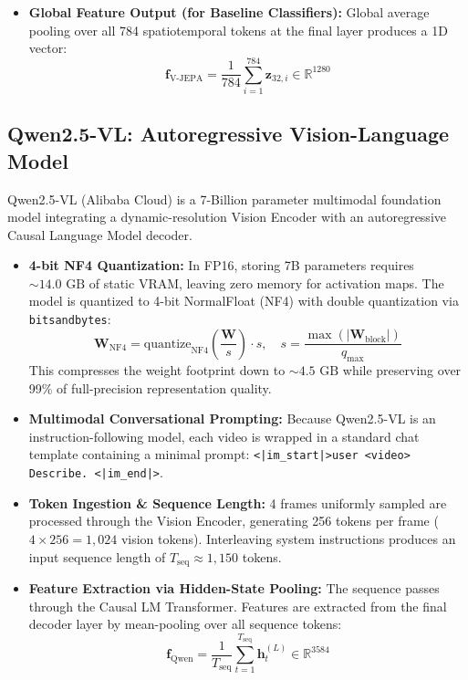 \documentclass[a4paper, 11pt]{article}
\begin{document}
\begin{itemize}
\begin{equation}
        \mathbf{F}_{\text{multi}} = [\bar{\mathbf{z}}_6;\; \bar{\mathbf{z}}_{12};\; \bar{\mathbf{z}}_{18};\; \bar{\mathbf{z}}_{24}] \in \mathbb{R}^{4 \times T' \times 1280} \quad (T'=4)
    \end{equation}
    \item \textbf{Global Feature Output (for Baseline Classifiers):} Global average pooling over all 784 spatiotemporal tokens at the final layer produces a 1D vector:
    \begin{equation}
        \mathbf{f}_{\text{V-JEPA}} = \frac{1}{784}\sum_{i=1}^{784} \mathbf{z}_{32, i} \in \mathbb{R}^{1280}
    \end{equation}
\end{itemize}

\subsection{Qwen2.5-VL: Autoregressive Vision-Language Model}
Qwen2.5-VL (Alibaba Cloud) is a 7-Billion parameter multimodal foundation model integrating a dynamic-resolution Vision Encoder with an autoregressive Causal Language Model decoder.

\begin{itemize}
    \item \textbf{4-bit NF4 Quantization:} In FP16, storing 7B parameters requires $\sim 14.0\text{ GB}$ of static VRAM, leaving zero memory for activation maps. The model is quantized to 4-bit NormalFloat (NF4) with double quantization via \texttt{bitsandbytes}:
    \begin{equation}
        \mathbf{W}_{\text{NF4}} = \text{quantize}_{\text{NF4}}\left(\frac{\mathbf{W}}{s}\right) \cdot s, \quad s = \frac{\max(|\mathbf{W}_{\text{block}}|)}{q_{\max}}
    \end{equation}
    This compresses the weight footprint down to $\sim 4.5\text{ GB}$ while preserving over 99\% of full-precision representation quality.
    \item \textbf{Multimodal Conversational Prompting:} Because Qwen2.5-VL is an instruction-following model, each video is wrapped in a standard chat template containing a minimal prompt: \texttt{<|im\_start|>user <video> Describe. <|im\_end|>}.
    \item \textbf{Token Ingestion \& Sequence Length:} 4 frames uniformly sampled are processed through the Vision Encoder, generating 256 tokens per frame ($4 \times 256 = 1,024$ vision tokens). Interleaving system instructions produces an input sequence length of $T_{\text{seq}} \approx 1,150$ tokens.
    \item \textbf{Feature Extraction via Hidden-State Pooling:} The sequence passes through the Causal LM Transformer. Features are extracted from the final decoder layer by mean-pooling over all sequence tokens:
    \begin{equation}
        \mathbf{f}_{\text{Qwen}} = \frac{1}{T_{\text{seq}}}\sum_{t=1}^{T_{\text{seq}}} \mathbf{h}_t^{(L)} \in \mathbb{R}^{3584}
    \end{equation}
\end{itemize}
\end{document}
